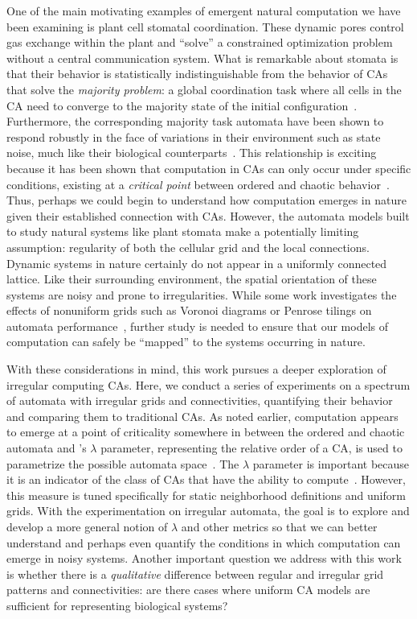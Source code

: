 \documentclass[a4paper,11pt]{article}
\begin{document}
One of the main motivating examples of emergent natural computation we have been examining is plant cell stomatal coordination. These dynamic pores control gas exchange within the plant and ``solve'' a constrained optimization problem without a central communication system. What is remarkable about stomata is that their behavior is statistically indistinguishable from the behavior of CAs that solve the \textit{majority problem}: a global coordination task where all cells in the CA need to converge to the majority state of the initial  configuration~\cite{mo07,pe04, we11}. Furthermore, the corresponding majority task automata have been shown to respond robustly in the face of variations in their environment such as state noise, much like their biological counterparts~\cite{me07}. This relationship is exciting because it has been shown that computation in CAs can only occur under specific conditions, existing at a \textit{critical point} between ordered and chaotic behavior~\cite{la90, wf86}. Thus, perhaps we could begin to understand how computation emerges in nature given their established connection with CAs. However, the automata models built to study natural systems like plant stomata make a potentially limiting assumption: regularity of both the cellular grid and the local connections. Dynamic systems in nature certainly do not appear in a uniformly connected lattice. Like their surrounding environment, the spatial orientation of these systems are noisy and prone to irregularities. While some work investigates the effects of nonuniform grids such as Voronoi diagrams or Penrose tilings on automata performance~\cite{ca06,fl01,hi05}, further study is needed to ensure that our models of computation can safely be ``mapped'' to the systems occurring in nature.

With these considerations in mind, this work pursues a deeper exploration of irregular computing CAs. Here, we conduct a series of experiments on a spectrum of automata with irregular grids and connectivities, quantifying their behavior and comparing them to traditional CAs. As noted earlier, computation appears to emerge at a point of criticality somewhere in between the ordered and chaotic automata and \citeauthor{la90}'s $\lambda$ parameter, representing the relative order of a CA, is used to parametrize the possible automata space~\cite{la90}. The $\lambda$ parameter is important because it is an indicator of the class of CAs that have the ability to compute~\cite{wo90}. However, this measure is tuned specifically for static neighborhood definitions and uniform grids. With the experimentation on irregular automata, the goal is to explore and develop a more general notion of $\lambda$ and other metrics so that we can better understand and perhaps even quantify the conditions in which computation can emerge in noisy systems. Another important question we address with this work is whether there is a \textit{qualitative} difference between regular and irregular grid patterns and connectivities: are there cases where uniform CA models are sufficient for representing biological systems? 
\end{document}
